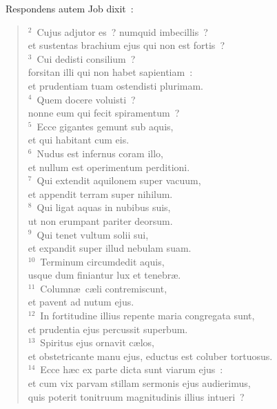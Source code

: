~\lettrine[lines=10,image=true,loversize=0.05,lraise=-0.03]{R}{}espondens autem Job dixit~:
\begin{flushleft}\begin{verse}\vspace{6pt}${}^{2}$~Cujus adjutor es~? numquid imbecillis~?\\ et sustentas brachium ejus qui non est fortis~?\\
${}^{3}$~Cui dedisti consilium~?\\ forsitan illi qui non habet sapientiam~:\\ et prudentiam tuam ostendisti plurimam.\\
${}^{4}$~Quem docere voluisti~?\\ nonne eum qui fecit spiramentum~?\\
${}^{5}$~Ecce gigantes gemunt sub aquis,\\ et qui habitant cum eis.\\
${}^{6}$~Nudus est infernus coram illo,\\ et nullum est operimentum perditioni.\\
${}^{7}$~Qui extendit aquilonem super vacuum,\\ et appendit terram super nihilum.\\
${}^{8}$~Qui ligat aquas in nubibus suis,\\ ut non erumpant pariter deorsum.\\
${}^{9}$~Qui tenet vultum solii sui,\\ et expandit super illud nebulam suam.\\
${}^{10}$~Terminum circumdedit aquis,\\ usque dum finiantur lux et tenebr\ae .\\
${}^{11}$~Column\ae\ c\ae li contremiscunt,\\ et pavent ad nutum ejus.\\
${}^{12}$~In fortitudine illius repente maria congregata sunt,\\ et prudentia ejus percussit superbum.\\
${}^{13}$~Spiritus ejus ornavit c\ae los,\\ et obstetricante manu ejus, eductus est coluber tortuosus.\\
${}^{14}$~Ecce h\ae c ex parte dicta sunt viarum ejus~:\\ et cum vix parvam stillam sermonis ejus audierimus,\\ quis poterit tonitruum magnitudinis illius intueri~?\end{verse}\end{flushleft}


